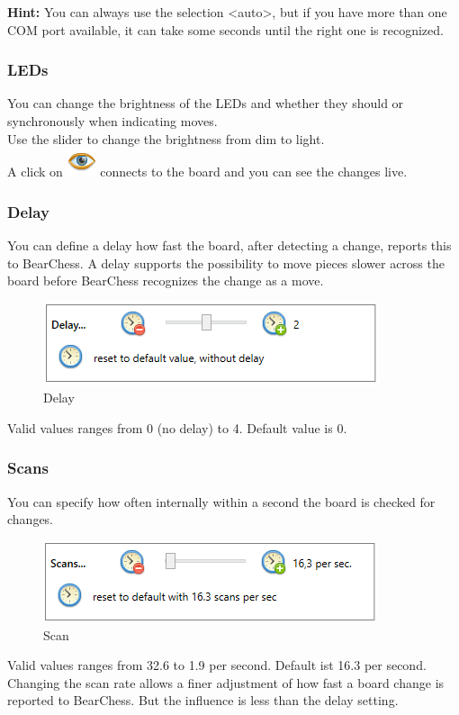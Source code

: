 \documentclass[11pt,a4paper]{article}
\begin{document}
\textbf{Hint:} You can always use the selection <auto>, but if you have more than one COM port available, it can take some seconds until the right one is recognized.\\

\subsubsection{LEDs}
You can change the brightness of the LEDs and whether they should or synchronously when indicating moves.\\
Use the slider to change the brightness from dim to light.\\
A click on \includegraphics[scale=0.4]{eye.png} connects to the board and you can see the changes live.

\subsubsection{Delay}
You can define a delay how fast the board, after detecting a change, reports this to BearChess. A delay supports the possibility to move pieces slower across the board before BearChess recognizes the change as a move. \\
\begin{figure}[H]
	\centering
	\includegraphics[scale=1.0]{MillenniumChessLink11.png}
	\caption{Delay}
	\label{fig:MillenniumChessLink11}
\end{figure}
Valid values ranges from 0 (no delay) to 4. Default value is 0.


\subsubsection{Scans}
You can specify how often internally within a second the board is checked for changes.\\
\begin{figure}[H]
	\centering
	\includegraphics[scale=1.0]{MillenniumChessLink12.png}
	\caption{Scan}
	\label{fig:MillenniumChessLink12}
\end{figure}
Valid values ranges from 32.6 to 1.9 per second. Default ist 16.3 per second.
Changing the scan rate allows a finer adjustment of how fast a board change is reported to BearChess. But the influence is less than the delay setting.
\end{document}
